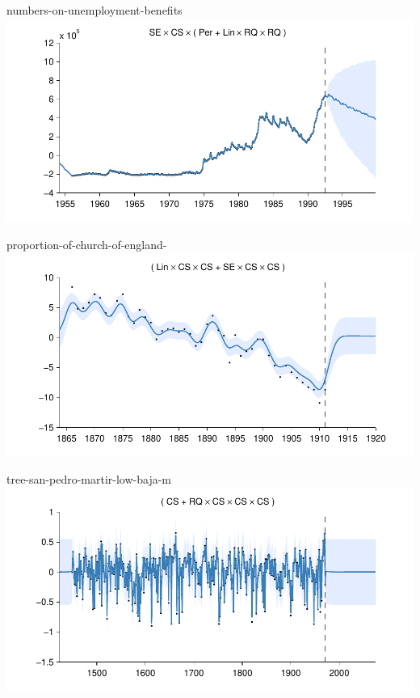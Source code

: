 \begin{frame}{numbers-on-unemployment-benefits}
  \center
  \includegraphics[width=1.0\textwidth]{figures/numbers-on-unemployment-benefits/numbers-on-unemployment-benefits_all}
\end{frame}  
    
\begin{frame}{proportion-of-church-of-england-}
  \center
  \includegraphics[width=1.0\textwidth]{figures/proportion-of-church-of-england-/proportion-of-church-of-england-_all}
\end{frame}  
    
\begin{frame}{tree-san-pedro-martir-low-baja-m}
  \center
  \includegraphics[width=1.0\textwidth]{figures/tree-san-pedro-martir-low-baja-m/tree-san-pedro-martir-low-baja-m_all}
\end{frame}  
    

